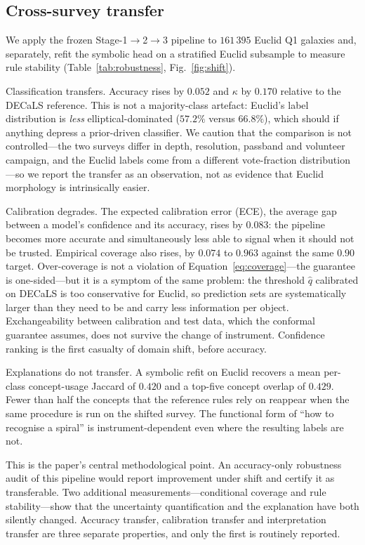 \documentclass[11pt]{article}
\begin{document}
\subsection{Cross-survey transfer}
\label{sec:robustness}

We apply the frozen Stage-1$\rightarrow$2$\rightarrow$3 pipeline to
$161\,395$ Euclid Q1 galaxies and, separately, refit the symbolic head on a
stratified Euclid subsample to measure rule stability
(Table~\ref{tab:robustness}, Fig.~\ref{fig:shift}).

Classification transfers. Accuracy rises by $0.052$ and $\kappa$ by $0.170$
relative to the DECaLS reference. This is not a majority-class artefact:
Euclid's label distribution is \emph{less} elliptical-dominated ($57.2\%$
versus $66.8\%$), which should if anything depress a prior-driven classifier.
We caution that the comparison is not controlled---the two surveys differ in
depth, resolution, passband and volunteer campaign, and the Euclid labels come
from a different vote-fraction distribution---so we report the transfer as an
observation, not as evidence that Euclid morphology is intrinsically easier.

Calibration degrades. The expected calibration error (ECE), the average gap
between a model's confidence and its accuracy, rises by $0.083$: the
pipeline becomes more accurate and simultaneously less able to signal when it
should not be trusted. Empirical coverage also rises, by $0.074$ to $0.963$
against the same $0.90$ target. Over-coverage is not a violation of
Equation~\eqref{eq:coverage}---the guarantee is one-sided---but it is a
symptom of the same problem: the threshold $\hat q$ calibrated on DECaLS is
too conservative for Euclid, so prediction sets are systematically larger than
they need to be and carry less information per object. Exchangeability between
calibration and test data, which the conformal guarantee assumes, does not
survive the change of instrument. Confidence ranking is the first casualty of
domain shift, before accuracy.

Explanations do not transfer. A symbolic refit on Euclid recovers a mean
per-class concept-usage Jaccard of $0.420$ and a top-five concept overlap of
$0.429$. Fewer than half the concepts that the reference rules rely on
reappear when the same procedure is run on the shifted survey. The functional
form of ``how to recognise a spiral'' is instrument-dependent even where the
resulting labels are not.

This is the paper's central methodological point. An accuracy-only robustness
audit of this pipeline would report improvement under shift and certify it as
transferable. Two additional measurements---conditional coverage and rule
stability---show that the uncertainty quantification and the explanation have
both silently changed. Accuracy transfer, calibration transfer and
interpretation transfer are three separate properties, and only the first is
routinely reported.
\end{document}

